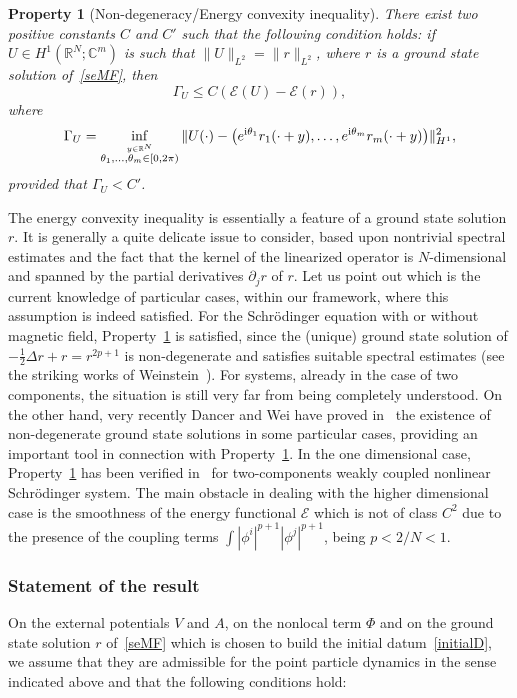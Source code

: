 \documentclass[11pt]{amsart}
\numberwithin{equation}{section}
\newtheorem{property}[theorem]{Property}
\theoremstyle{definition}
\begin{document}
\begin{property}[Non-degeneracy/Energy convexity inequality]
    \label{stabPhi}
There exist two positive constants $C$ and $C'$ such that the following
condition holds: if $U\in
H^1({{\mathbb R}}^N;{{\mathbb C}}^m)$ is such that $\|U\|_{L^2}=\|r\|_{L^2}$, where $r$
is a ground state solution of~\eqref{seMF}, then
\begin{equation}
\Gamma_U \leq C\left(\mathcal E(U)-\mathcal E(r)\right),
\end{equation}
where
\begin{equation}
    \label{gammaUdef}
\Gamma_{U}=\inf_{\overset{y\in{{\mathbb R}}^N}{
\theta_1, \dots, \theta_m\in [0,2\pi)}
}\|U(\cdot)-\big(e^{{{\rm i}} \theta_1}r_1(\cdot +y), \dots,
e^{{{\rm i}} \theta_m}r_m(\cdot +y)\big) \|_{H^1}^{2},
\end{equation}
provided that $\Gamma_U<C'$.
\end{property}
The energy convexity inequality is essentially a feature of a ground state
solution $r$. It is generally a quite delicate issue to consider, based upon
nontrivial spectral estimates and the fact that the kernel of the linearized operator is
$N$-dimensional and spanned by the partial derivatives $\partial_j r$ of $r$.
Let us point out which is the current
knowledge of particular cases, within our framework, where this assumption is indeed satisfied.
For the Schr\"odinger equation with or without magnetic field, Property~\ref{stabPhi}
is satisfied, since the (unique) ground state solution of $-\frac{1}{2}\Delta r+r=r^{2p+1}$ is
non-degenerate and satisfies suitable spectral estimates (see the striking works of Weinstein~\cite{We1,We2}).
For systems, already in the case of two components, the situation is still very far from being
completely understood. On the other hand, very recently Dancer and Wei have proved in~\cite{dw} the existence
of non-degenerate ground state solutions in some particular cases, providing an important tool in connection
with Property~\ref{stabPhi}.
In the one dimensional case, Property~\ref{stabPhi} has been verified in~\cite{mmp3}
for two-components weakly coupled nonlinear Schr\"odinger system. The main obstacle in dealing
with the higher dimensional case is the smoothness of the energy functional ${\mathcal E}$ which is not of
class $C^2$ due to the presence of the coupling terms $\int |\phi^i|^{p+1}|\phi^j|^{p+1}$, being $p<2/N<1$.

\smallskip
\subsubsection{Statement of the result}
On the external potentials $V$ and $A$,
on the nonlocal term $\Phi$ and on the ground state solution $r$
of~\eqref{seMF} which is chosen to build the initial datum~\eqref{initialD},
we assume that they are admissible for the point particle dynamics in the sense indicated above
and that the following conditions hold:
\vskip6pt
\noindent
\end{document}
